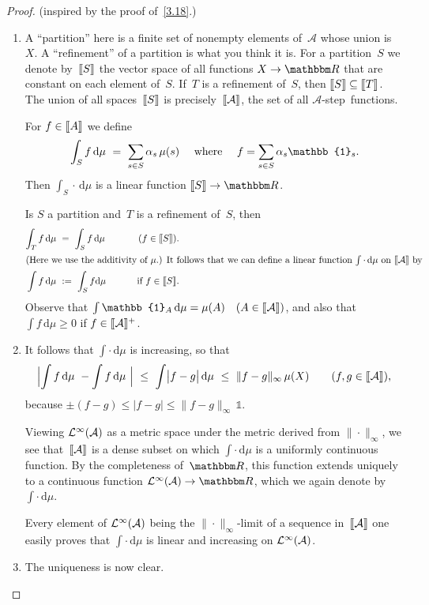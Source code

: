 \documentclass[main.tex]{subfiles}
\begin{document}
\begin{proof}
(inspired by the proof of~\ref{3.18}.)
\begin{enumerate}[label=(\Roman*)]
\item\label{6.10-I}
A ``partition'' here is a finite set of nonempty elements of~$\mathcal A$
whose union is~$X$.
A ``refinement'' of a partition is what you think it is.
For a partition~$S$ we denote by~$\lbb S\rbb$
the vector space of all functions $X\ra \R$
that are constant on each element of~$S$.
If~$T$ is a refinement of~$S$,
then $\lbb S \rbb \subseteq \lbb T \rbb$.
The union of all spaces~$\lbb S \rbb$ is precisely~$\lbb \mathcal A \rbb$,
the set of all $\mathcal{A}$-step~functions.

For $f\in\lbb A \rbb$ we define
\begin{equation*}
\int_S f\,\mathrm{d}\mu\ =\ \sum_{s\in S} \alpha_s\,\mu(s)
\quad\htam{ where }\quad f=\sum_{s\in S} \alpha_s \mathbb{1}_s\htam{.}
\end{equation*}
Then $\int_S \cdot\,\mathrm{d}\mu$ is a linear function $\lbb S \rbb \ra \R$.

Is $S$ a partition and~$T$ is a refinement of~$S$, then
\begin{alignat*}{2}
\int_T f\,\mathrm{d}\mu\ &=\ \int_S 
f\,\mathrm{d}\mu\qquad&(f\in \lbb S \rbb)\htam{.} \\
\intertext{(Here we use the additivity of~$\mu$.)
It follows that we can define a linear function $\int\cdot\,\mathrm d\mu$
on~$\lbb \mathcal A \rbb$ by}
\int f\,\mathrm{d}\mu\ &:=\ \int_S f\mathrm{d}\mu
 \qquad &\htam{ if } f\in\lbb S \rbb\htam{.}
\end{alignat*}
Observe that $\int \mathbb{1}_A\,\mathrm{d}\mu=\mu(A)
\quad(A\in\lbb \mathcal A \rbb)$,
and also that $\int f\,\mathrm{d}\mu\geq 0$
if $f\in\lbb\mathcal{A}\rbb^+$.
%
\item\label{6.10-II}
It follows that $\int\cdot\,\mathrm{d}\mu$ is increasing, so that
\begin{equation*}
\Bigl|\int f\,\mathrm{d}\mu\  -\int f\,\mathrm{d}\mu\  \Bigr|
\ \leq\ \int \bigl|f-g\bigr|\,\mathrm{d}\mu
\ \leq\ \|f-g\|_\infty \,\mu(X)\qquad(f,g\in\lbb \mathcal A \rbb)
\htam{,}
\end{equation*}
because $\pm(f-g)\leq|f-g|\leq\|f-g\|_\infty\,\mathbb{1}$.

Viewing $\mathcal{L}^\infty(\mathcal A)$ as a metric space
under the metric derived from $\|\cdot\|_\infty$,
we see that~$\lbb\mathcal{A}\rbb$ is a dense subset
on which $\int\cdot\,\mathrm d\mu$ is a uniformly continuous function.
By the completeness of~$\R$,
this function extends uniquely to a continuous function
$\BLeb(\mathcal A)\ra \R$,
which we again denote by $\int\cdot\,\mathrm{d}\mu$.

Every element of $\mathcal{L}^\infty(\mathcal A)$ being the $\|\cdot\|_\infty$-limit
of a sequence in~$\lbb\mathcal A\rbb$
one easily proves that $\int\cdot\,\mathrm d\mu$ is linear
and increasing on $\mathcal{L}^\infty(\mathcal A)$.
%
\item\label{6.10-III}
The uniqueness is now clear. \xqed
\end{enumerate}
\end{proof}
\end{document}
